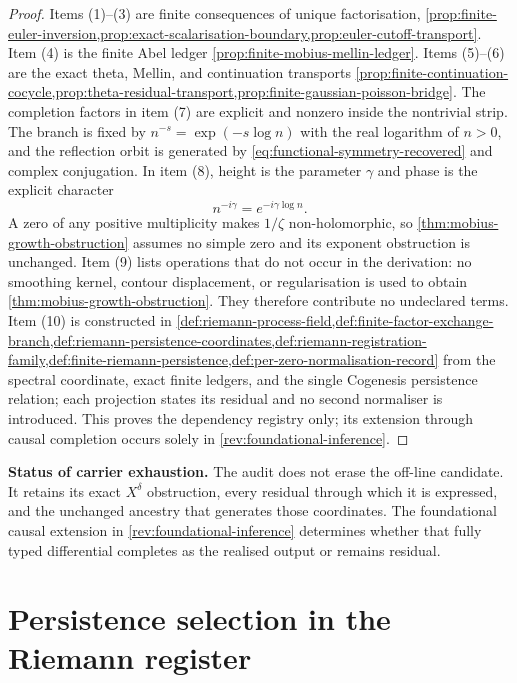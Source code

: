 \documentclass[11pt,a4paper]{article}
\theoremstyle{definition}
\begin{document}
\begin{proof}
Items (1)--(3) are finite consequences of unique factorisation,
\cref{prop:finite-euler-inversion,prop:exact-scalarisation-boundary,prop:euler-cutoff-transport}.
Item (4) is the finite Abel ledger
\cref{prop:finite-mobius-mellin-ledger}. Items (5)--(6) are the exact theta,
Mellin, and continuation transports
\cref{prop:finite-continuation-cocycle,prop:theta-residual-transport,prop:finite-gaussian-poisson-bridge}.
The completion factors in item (7) are explicit and nonzero inside the
nontrivial strip. The branch is fixed by
$n^{-s}=\exp(-s\log n)$ with the real logarithm of $n>0$, and the reflection
orbit is generated by \cref{eq:functional-symmetry-recovered} and complex
conjugation. In item (8), height is the parameter $\gamma$ and phase is the
explicit character
\[
  n^{-i\gamma}=e^{-i\gamma\log n}.
\]
A zero of any positive multiplicity makes $1/\zeta$ non-holomorphic, so
\cref{thm:mobius-growth-obstruction} assumes no simple zero and its exponent
obstruction is unchanged. Item (9) lists operations that do not occur in the
derivation: no smoothing kernel, contour displacement, or regularisation is
used to obtain \cref{thm:mobius-growth-obstruction}. They therefore contribute
no undeclared terms. Item (10) is constructed in
\cref{def:riemann-process-field,def:finite-factor-exchange-branch,def:riemann-persistence-coordinates,def:riemann-registration-family,def:finite-riemann-persistence,def:per-zero-normalisation-record}
from the spectral coordinate, exact finite ledgers, and the single Cogenesis
persistence relation; each projection states its residual and no second
normaliser is introduced. This proves the dependency registry only; its
extension through causal completion occurs solely in
\cref{rev:foundational-inference}.
\end{proof}

\begin{reviewbox}
\textbf{Status of carrier exhaustion.}
The audit does not erase the off-line candidate. It retains its exact
$X^\delta$ obstruction, every residual through which it is expressed, and the
unchanged ancestry that generates those coordinates. The foundational
causal extension in \cref{rev:foundational-inference} determines whether that
fully typed differential completes as the realised output or remains residual.
\end{reviewbox}

\section{Persistence selection in the Riemann register}
\label{sec:riemann-persistence}
\end{document}
